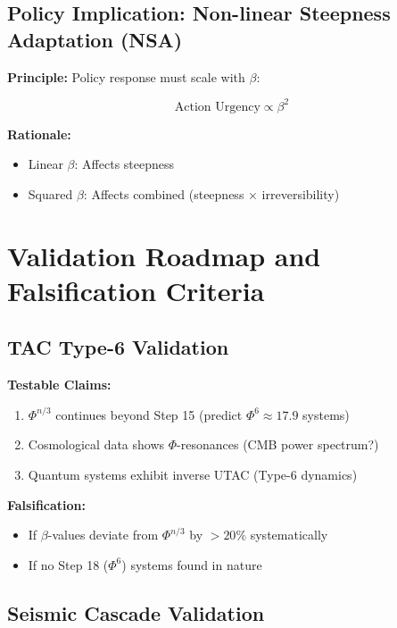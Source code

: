 \documentclass[11pt,a4paper]{article}
\begin{document}
\subsection{Policy Implication: Non-linear Steepness Adaptation (NSA)}

\textbf{Principle:} Policy response must scale with $\beta$:

\begin{equation}
\text{Action Urgency} \propto \beta^2
\end{equation}

\textbf{Rationale:}
\begin{itemize}
\item Linear $\beta$: Affects steepness
\item Squared $\beta$: Affects combined (steepness × irreversibility)
\end{itemize}

\section{Validation Roadmap and Falsification Criteria}

\subsection{TAC Type-6 Validation}

\textbf{Testable Claims:}
\begin{enumerate}
\item $\Phi^{n/3}$ continues beyond Step 15 (predict $\Phi^6 \approx 17.9$ systems)
\item Cosmological data shows $\Phi$-resonances (CMB power spectrum?)
\item Quantum systems exhibit inverse UTAC (Type-6 dynamics)
\end{enumerate}

\textbf{Falsification:}
\begin{itemize}
\item If $\beta$-values deviate from $\Phi^{n/3}$ by $> 20\%$ systematically
\item If no Step 18 ($\Phi^6$) systems found in nature
\end{itemize}

\subsection{Seismic Cascade Validation}
\end{document}
